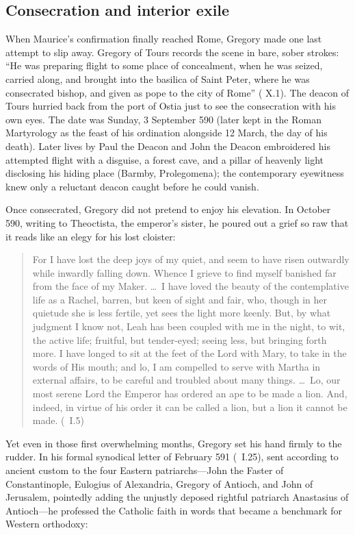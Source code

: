 \subsection{Consecration and interior exile}

When Maurice's confirmation finally reached Rome, Gregory made one last attempt
to slip away. Gregory of Tours records the scene in bare, sober strokes: ``He
was preparing flight to some place of concealment, when he was seized, carried
along, and brought into the basilica of Saint Peter, where he was consecrated
bishop, and given as pope to the city of Rome'' (
X.1). The deacon of Tours hurried back from the port of Ostia just to see the
consecration with his own eyes. The date was Sunday, 3 September 590 (later
kept in the Roman Martyrology as the feast of his ordination alongside 12
March, the day of his death). Later lives by Paul the Deacon and John the
Deacon embroidered his attempted flight with a disguise, a forest cave, and a
pillar of heavenly light disclosing his hiding place (Barmby, Prolegomena); the
contemporary eyewitness knew only a reluctant deacon caught before he could
vanish.

Once consecrated, Gregory did not pretend to enjoy his elevation. In October
590, writing to Theoctista, the emperor's sister, he poured out a grief so raw
that it reads like an elegy for his lost cloister:

\begin{quote}
For I have lost the deep joys of my quiet, and seem to have risen outwardly
while inwardly falling down. Whence I grieve to find myself banished far from
the face of my Maker. \dots\ I have loved the beauty of the contemplative life
as a Rachel, barren, but keen of sight and fair, who, though in her quietude
she is less fertile, yet sees the light more keenly. But, by what judgment I
know not, Leah has been coupled with me in the night, to wit, the active life;
fruitful, but tender-eyed; seeing less, but bringing forth more. I have longed
to sit at the feet of the Lord with Mary, to take in the words of His mouth;
and lo, I am compelled to serve with Martha in external affairs, to be careful
and troubled about many things. \dots\ Lo, our most serene Lord the Emperor has
ordered an ape to be made a lion. And, indeed, in virtue of his order it can be
called a lion, but a lion it cannot be made. (\ I.5)
\end{quote}

Yet even in those first overwhelming months, Gregory set his hand firmly to the
rudder. In his formal synodical letter of February 591 (\ I.25), sent
according to ancient custom to the four Eastern patriarchs---John the Faster of
Constantinople, Eulogius of Alexandria, Gregory of Antioch, and John of
Jerusalem, pointedly adding the unjustly deposed rightful patriarch Anastasius
of Antioch---he professed the Catholic faith in words that became a benchmark
for Western orthodoxy:

